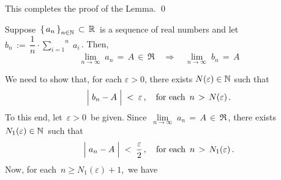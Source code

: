 \vskip 0.5cm
\noindent
This completes the proof of the Lemma.
\qed


\begin{lemma}\label{lemma:SequenceOfPartialMeans}
\mbox{}\vskip 0.1cm
\noindent
Suppose \,$\left\{\,a_{n}\,\right\}_{n\in\mathbb{N}}\,\subset\,\mathbb{R}$\, is a sequence of real numbers and let
\,$b_{n} \, := \, \dfrac{1}{n}\cdot\overset{n}{\underset{i=1}{\sum}}\;a_{i}$\,.
Then,
\begin{equation*}
\underset{n\rightarrow\infty}{\lim}\;a_{n} \,=\, A \,\in\, \Re
\quad\Longrightarrow\quad
\underset{n\rightarrow\infty}{\lim}\;b_{n} \,=\, A
\end{equation*}
\end{lemma}
\proof
We need to show that, for each $\varepsilon > 0$, there exists $N(\varepsilon) \in \mathbb{N}$ such that
\begin{equation*}
\left\vert\;b_{n} - \overset{{\color{white}.}}{A}\;\right\vert \; < \; \varepsilon\,,
\quad
\textnormal{for each \,$n \,>\, N(\varepsilon)$}\,.
\end{equation*}
To this end, let \,$\varepsilon > 0$\, be given.
Since \,$\underset{n\rightarrow\infty}{\lim}\;a_{n} \,=\, A \,\in\, \Re$\,,
there exists \,$N_{1}(\varepsilon) \in \mathbb{N}$\, such that
\begin{equation*}
\left\vert\;a_{n} - \overset{{\color{white}.}}{A}\;\right\vert \; < \; \dfrac{\varepsilon}{2}\,,
\quad
\textnormal{for each \,$n \,>\, N_{1}(\varepsilon)$}\,.
\end{equation*}
Now, for each \,$n \geq N_{1}(\varepsilon)+1$,\, we have
